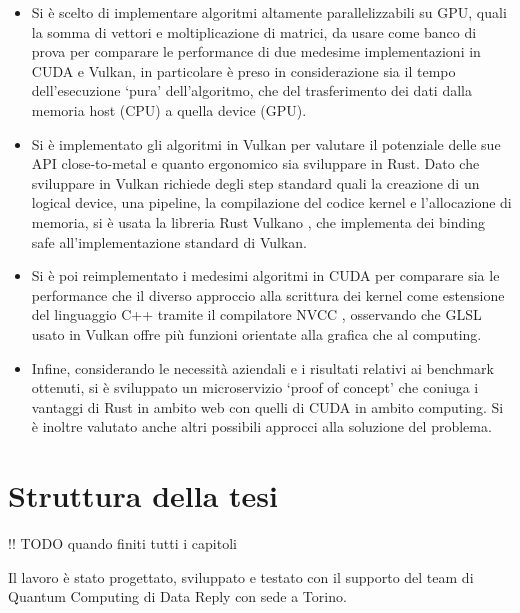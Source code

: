 \begin{itemize}
    \item Si è scelto di implementare algoritmi altamente parallelizzabili su GPU, quali la somma di vettori e moltiplicazione di matrici, da usare come banco di prova per comparare le performance di due medesime implementazioni in CUDA e Vulkan, in particolare è preso in considerazione sia il tempo dell'esecuzione `pura' dell'algoritmo, che del trasferimento dei dati dalla memoria host (CPU) a quella device (GPU).
    \item Si è implementato gli algoritmi in Vulkan per valutare il potenziale delle sue API close-to-metal e quanto ergonomico sia sviluppare in Rust. Dato che sviluppare in Vulkan richiede degli step standard quali la creazione di un logical device, una pipeline, la compilazione del codice kernel e l'allocazione di memoria, si è usata la libreria Rust Vulkano \cite[]{github:Vulkano}, che implementa dei binding safe all'implementazione standard di Vulkan.
    \item Si è poi reimplementato i medesimi algoritmi in CUDA per comparare sia le performance che il diverso approccio alla scrittura dei kernel come estensione del linguaggio C++ tramite il compilatore \gls{NVCC} \cite[]{NVIDIA:nvcc}, osservando che GLSL \cite[]{KG:GLSL} usato in Vulkan offre più funzioni orientate alla grafica che al computing.
    \item Infine, considerando le necessità aziendali e i risultati relativi ai benchmark ottenuti, si è sviluppato un microservizio `proof of concept' che coniuga i vantaggi di Rust in ambito web con quelli di CUDA in ambito computing. Si è inoltre valutato anche altri possibili approcci alla soluzione del problema.
\end{itemize}



\section[Struttura della tesi]{Struttura della tesi}

!! TODO quando finiti tutti i capitoli

Il lavoro è stato progettato, sviluppato e testato con il supporto del team di Quantum Computing di Data Reply con sede a Torino. 

